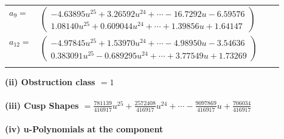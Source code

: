 \documentclass[1p]{elsarticle_modified}
\theoremstyle{definition}
\begin{document}
\begin{tabular}{m{7pt} m{180pt} m{7pt} m{180pt} }
\flushright $a_{9}=$&$\begin{pmatrix}-4.63895 u^{25}+3.26592 u^{24}+\cdots-16.7292 u-6.59576\\1.08140 u^{25}+0.609044 u^{24}+\cdots+1.39856 u+1.64147\end{pmatrix}$ \\
\flushright $a_{12}=$&$\begin{pmatrix}-4.97845 u^{25}+1.53970 u^{24}+\cdots-4.98950 u-3.54636\\0.383091 u^{25}-0.689295 u^{24}+\cdots+3.77549 u+1.73269\end{pmatrix}$\\&\end{tabular}
\flushleft \textbf{(ii) Obstruction class $= 1$}\\~\\
\flushleft \textbf{(iii) Cusp Shapes $= \frac{781139}{416917} u^{25}+\frac{2572408}{416917} u^{24}+\cdots-\frac{9097869}{416917} u+\frac{706034}{416917}$}\\~\\
\newpage\renewcommand{\arraystretch}{1}
\flushleft \textbf{(iv) u-Polynomials at the component}\newline \\
\end{document}
